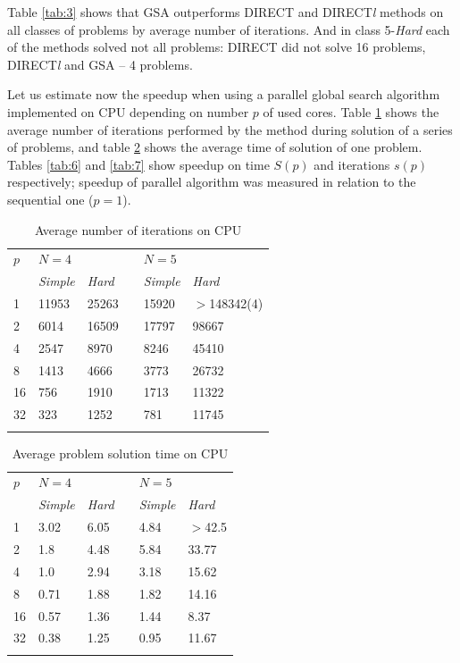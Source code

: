 \documentclass[smallcondensed]{svjour3}     %
\begin{document}
Table \ref{tab:3} shows that GSA outperforms DIRECT and DIRECT\textit{l} methods on all classes of problems by average number of iterations. And in class 5-\textit{Hard} each of the methods solved not all problems: DIRECT did not solve 16 problems, DIRECT\textit{l} and GSA -- 4 problems.

Let us estimate now the speedup when using a parallel global search algorithm implemented on CPU depending on number $p$ of used cores. Table \ref{tab:4} shows the average number of iterations performed by the method during solution of a series of problems, and table \ref{tab:5} shows the average time of solution of one problem. Tables \ref{tab:6} and \ref{tab:7} show speedup on time $S(p)$ and iterations $s(p)$ respectively; speedup of parallel algorithm was measured in relation to the sequential one ($p=1$).

\begin{table}
	\caption{Average number of iterations on CPU}
	\label{tab:4}
	\center
	\begin{tabular}{llllll}
		\hline\noalign{\smallskip}
		$p$ & \multicolumn{2}{l}{ $N=4$ } & & \multicolumn{2}{l}{$N=5$} \\
		\noalign{\smallskip} \cline{2-3} \cline{5-6} \noalign{\smallskip}
		 & \textit{Simple} & \textit{Hard} & & \textit{Simple} & \textit{Hard}  \\
		\noalign{\smallskip} \hline \noalign{\smallskip}
		1 &	11953 &	25263 & &	15920 &	$>$148342(4) \\
		2 &	6014 &	16509 & & 17797 &	98667 \\
		4 &	2547 &	8970 & &	8246 &	45410 \\
		8 &	1413 &	4666 & &	3773 &	26732 \\
		16 &	756 &	1910 & &	1713 &	11322 \\
		32 &	323 &	1252 & &	781 &	11745 \\
		\noalign{\smallskip}\hline
	\end{tabular}
\end{table}

\begin{table}
	\caption{Average problem solution time on CPU}
	\label{tab:5}
	\center
	\begin{tabular}{llllll}
		\hline\noalign{\smallskip}
		$p$ & \multicolumn{2}{l}{ $N=4$ } & & \multicolumn{2}{l}{$N=5$} \\
		\noalign{\smallskip} \cline{2-3} \cline{5-6} \noalign{\smallskip}
		 & \textit{Simple} & \textit{Hard} & & \textit{Simple} & \textit{Hard}  \\
		\noalign{\smallskip} \hline \noalign{\smallskip}
		1 &	3.02 &	6.05 & &	4.84 &	$>$42.5 \\
		2 &	1.8 &	4.48 & &	5.84 &	33.77 \\
		4 &	1.0 &	2.94 & &	3.18 &	15.62 \\
		8 &	0.71 &	1.88 & &	1.82 &	14.16 \\
		16 &	0.57 &	1.36 & &	1.44 &	8.37 \\
		32 &	0.38 &	1.25 & &	0.95 &	11.67 \\
		\noalign{\smallskip}\hline
	\end{tabular}
\end{table}
\end{document}
